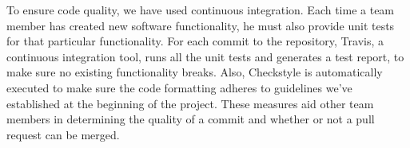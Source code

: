 To ensure code quality, we have used continuous integration. Each time a team member has created new software functionality, he must also provide unit tests for that particular functionality. For each commit to the repository, Travis, a continuous integration tool, runs all the unit tests and generates a test report, to make sure no existing functionality breaks. Also, Checkstyle is automatically executed to make sure the code formatting adheres to guidelines we've established at the beginning of the project. These measures aid other team members in determining the quality of a commit and whether or not a pull request can be merged.